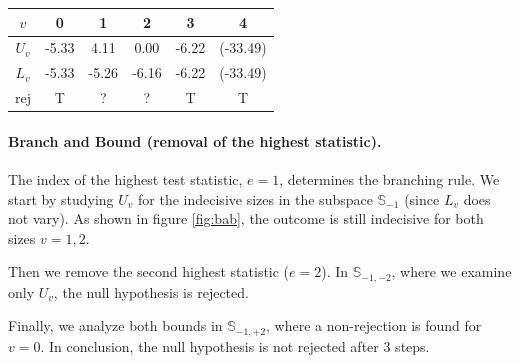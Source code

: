 \documentclass[11pt,a4paper,openright,twoside]{article}
\begin{document}
\begin{table}[h!]
\centering
\begin{tabular}{cccccc}
\toprule
$v$ & 0 & 1 & 2 & 3 & 4\\
\midrule
$U_v$ & -5.33 & 4.11 & 0.00 & -6.22 & (-33.49)\\
$L_v$ & -5.33 & -5.26 & -6.16 & -6.22 & (-33.49)\\
\midrule
rej & T & ? & ? & T & T\\
\bottomrule
\end{tabular}
\end{table}

\newpage

\paragraph{Branch and Bound (removal of the highest statistic).} The index of the highest test statistic, $e=1$, determines the branching rule. We start by studying $U_v$ for the indecisive sizes in the subspace $\mathbb{S}_{-1}$ (since $L_v$ does not vary). As shown in figure \ref{fig:bab}, the outcome is still indecisive for both sizes $v=1,2$.

Then we remove the second highest statistic ($e=2$). In $\mathbb{S}_{-1,-2}$, where we examine only $U_v$, the null hypothesis is rejected.

Finally, we analyze both bounds in $\mathbb{S}_{-1,+2}$, where a non-rejection is found for $v=0$. In conclusion, the null hypothesis is not rejected after 3 steps.

\vspace{5mm}
\end{document}
